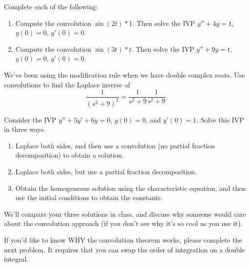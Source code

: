 \begin{problem}
Complete each of the following:
\begin{enumerate}
 \item  Compute the convolution $\sin(2t)*1$. Then solve the IVP $y''+4y = 1$, $y(0)=0$, $y'(0)=0$. 
 \item  Compute the convolution $\sin(3t)*t$. Then solve the IVP $y''+9y = t$, $y(0)=0$, $y'(0)=0$. 
\end{enumerate}
\end{problem}


\begin{problem}
 We've been using the modification rule when we have double complex roots. Use convolutions to find the Laplace inverse of $$\dfrac{1}{(s^2+9)^2}=\dfrac{1}{s^2+9}\dfrac{1}{s^2+9}.$$
\end{problem}

\begin{problem}
 Consider the IVP $y''+5y'+6y=0$, $y(0)=0$, and $y'(0)=1$. Solve this IVP in three ways.
\begin{enumerate}
 \item Laplace both sides, and then use a convolution (no partial fraction decomposition) to obtain a solution.
 \item Laplace both sides, but use a partial fraction decomposition.
 \item Obtain the homogeneous solution using the characteristic equation, and then use the initial conditions to obtain the constants.
\end{enumerate}
  We'll compare your three solutions in class, and discuss why someone would care about the convolution approach (if you don't see why it's so cool as you use it).
\end{problem}

If you'd like to know WHY the convolution theorem works, please complete the next problem. It requires that you can swap the order of integration on a double integral.

